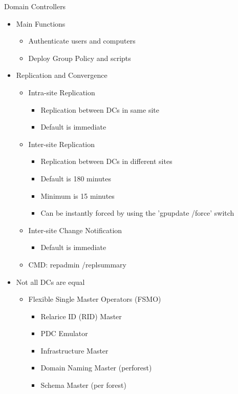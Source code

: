 Domain Controllers
\begin{itemize}
    \item Main Functions
    \begin{itemize}
        \item Authenticate users and computers
        \item Deploy Group Policy and scripts
    \end{itemize}
\item Replication and Convergence
\begin{itemize}
    \item Intra-site Replication
    \begin{itemize}
        \item Replication between DCs in same site
        \item Default is immediate
    \end{itemize}
\item Inter-site Replication
\begin{itemize}
    \item Replication between DCs in different sites
    \item Default is 180 minutes
    \item Minimum is 15 minutes
    \item Can be instantly forced by using the 'gpupdate /force' switch
\end{itemize}
\item Inter-site Change Notification
\begin{itemize}
    \item Default is immediate
\end{itemize}
\item CMD: repadmin /replsummary
\end{itemize}
\item Not all DCs are equal
\begin{itemize}
    \item Flexible Single Master Operators (FSMO)
    \begin{itemize}
        \item Relarice ID (RID) Master
        \item PDC Emulator
        \item Infrastructure Master
        \item Domain Naming Master (perforest)
        \item Schema Master (per forest)
    \end{itemize}
\end{itemize}
\end{itemize}

